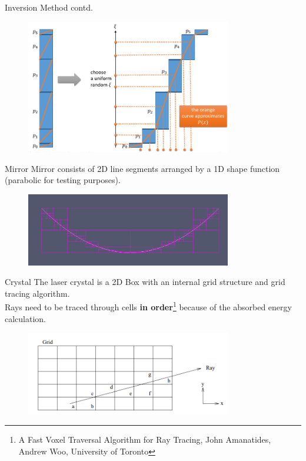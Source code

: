 \documentclass[aspectratio=43,t]{beamer}
\begin{document}
		\begin{frame}[fragile]{Inversion Method contd.}
		\begin{figure}
		\centering
		\includegraphics[width=0.8\textwidth]{images/inversion.png}
		\end{figure}
    \end{frame}


	
	\begin{frame}[fragile]{Mirror}
			Mirror consists of 2D line segments arranged by a 1D shape function (parabolic for testing
			purposes).

			\begin{figure}
			\centering
			\includegraphics[width=0.8\textwidth]{images/mirror.png}
			\end{figure}
    \end{frame}

    \begin{frame}[fragile]{Crystal}
			The laser crystal is a 2D Box with an internal grid structure and grid tracing algorithm.\\
			Rays need to be traced through cells \textbf{in order}\footnote{A Fast Voxel Traversal Algorithm for Ray Tracing, John Amanatides, Andrew Woo, University of Toronto} because 
			of the absorbed energy calculation.\\

			\begin{figure}
			\centering
			\includegraphics[width=0.8\textwidth]{images/grid.png}
			\end{figure}
    \end{frame}
\end{document}

